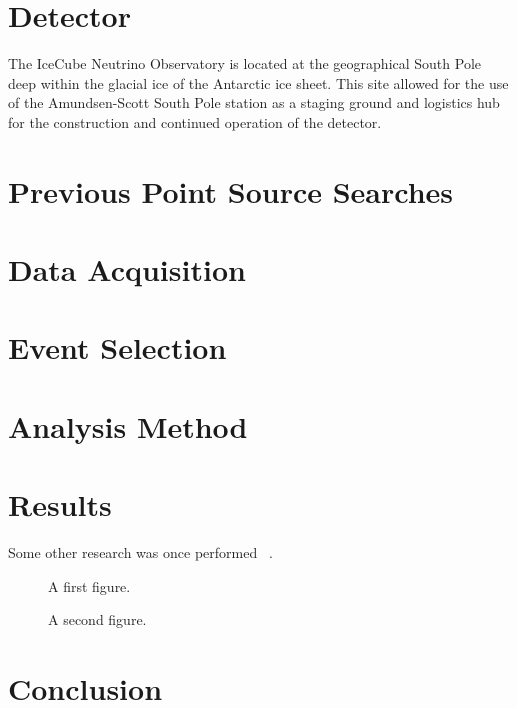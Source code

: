 \documentclass{gatech-thesis}
\begin{document}

\chapter{Detector}
The IceCube Neutrino Observatory is located at the geographical South Pole deep within the glacial ice of the Antarctic ice sheet. This site allowed for the use of the Amundsen-Scott South Pole station as a staging ground and logistics hub for the construction and continued operation of the detector. 


\chapter{Previous Point Source Searches}

\chapter{Data Acquisition}

\chapter{Event Selection}

\chapter{Analysis Method}

\chapter{Results}
Some other research was once performed ~\cite{Nobody06}.

\begin{figure}
\caption{A first figure.}
\end{figure}

\begin{figure}
\caption{A second figure.}
\end{figure}
\chapter{Conclusion}

\end{document}
